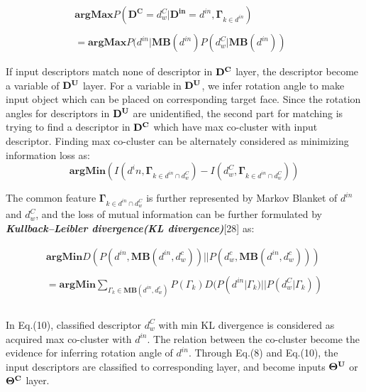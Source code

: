 \documentclass{tADR2e}
\begin{document}
\begin{equation}
\begin{array}{ll}

\mathbf{argMax}P(\mathbf{D^C} = d^C_w  | \mathbf{D^{in}} = d^{in} , \mathbf{\Gamma}_{k \in {d^{in}}}) &\\\\
= \mathbf{argMax}P(d^{in} | \mathbf{MB}(d^{in}){P(d^{C}_w | \mathbf{MB}(d^{in}))}
\end{array}
\end{equation}


If input descriptors match none of descriptor in $\bf{D^C}$ layer, the descriptor become a variable of  $\bf{D^U}$ layer. For a variable in $\bf{D^U}$, we infer rotation angle to make input object which can be placed on corresponding target face. Since the rotation angles for descriptors in $\bf{D^U}$ are unidentified, the second part for matching is trying to find a descriptor in $\bf{D^C}$ which have max co-cluster with input descriptor. Finding max co-cluster can be alternately considered as minimizing information loss as:
\begin{equation}
\mathbf{argMin}(I(d^in , \mathbf{\Gamma}_{k \in d^{in} \cap d^C_w}) - I(d^C_w , \mathbf{\Gamma}_{k \in d^{in} \cap d^C_w}))
\end{equation}

The common feature $\mathbf{\Gamma}_{k \in d^{in} \cap d^C_w}$ is further represented by Markov Blanket of $d^{in}$ and $d^C_w$, and the loss of mutual information can be further formulated by \textbf{\textit{Kullback–Leibler divergence(KL divergence)}}[28] as:

\begin{equation}
\begin{array}{ll}
\mathbf{argMin}D(P(d^{in} , \mathbf{MB}(d^{in},d^c_w))||P(d^c_w , \mathbf{MB}(d^{in},d^c_w)))\\\\
= \mathbf{argMin}\sum_{\Gamma_k\in\mathbf{MB}(d^{in},d^c_w)}P(\Gamma_k)D(P(d^{in}|\Gamma_k)||P(d^C_w|\Gamma_k))\\\\
\end{array}
\end{equation}

In Eq.(10), classified descriptor $d^C_w$ with min KL divergence is considered as acquired max co-cluster with $d^{in}$. The relation between the co-cluster become the evidence for inferring rotation angle of $d^{in}$. Through Eq.(8) and Eq.(10), the input descriptors are classified to corresponding layer, and become inputs $\bf{\Theta^{U}}$ or $\bf{\Theta^{C}}$ layer.
\end{document}
